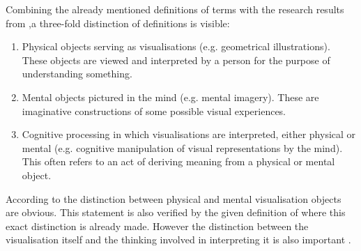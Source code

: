 Combining the already mentioned definitions of terms with the research results from \citeauthor{Phillips2010},a three-fold distinction of definitions is visible:
\begin{enumerate}
\item Physical objects serving as visualisations (e.g. geometrical illustrations). These objects are viewed and interpreted by a person for the purpose of understanding something.
\item Mental objects pictured in the mind (e.g. mental imagery). These are imaginative constructions of some possible visual experiences.
\item Cognitive processing in which visualisations are interpreted, either physical or mental (e.g. cognitive manipulation of visual representations by the mind). This often refers to an act of deriving meaning from a physical or mental object.
\end{enumerate}

According to \citeauthor{Phillips2010} the distinction between physical and mental visualisation objects are obvious. This statement is also verified by the given definition of \citeauthor{mccormick:1987} where this exact distinction is already made. However the distinction between the visualisation itself and the thinking involved in interpreting it is also important .